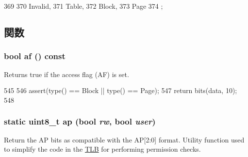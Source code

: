 \begin{DoxyCode}
369                        {
370             Invalid,
371             Table,
372             Block,
373             Page
374         };
\end{DoxyCode}


\subsection{関数}
\hypertarget{classArmISA_1_1TableWalker_1_1LongDescriptor_a8f028be885d2543df6e8a1278a54d30b}{
\subsubsection[{af}]{\setlength{\rightskip}{0pt plus 5cm}bool af () const}}
\label{classArmISA_1_1TableWalker_1_1LongDescriptor_a8f028be885d2543df6e8a1278a54d30b}
Returns true if the access flag (AF) is set. 


\begin{DoxyCode}
545         {
546             assert(type() == Block || type() == Page);
547             return bits(data, 10);
548         }
\end{DoxyCode}
\hypertarget{classArmISA_1_1TableWalker_1_1LongDescriptor_a86d1f2fd0beb21ce5ffa7925768e378b}{
\subsubsection[{ap}]{\setlength{\rightskip}{0pt plus 5cm}static uint8\_\-t ap (bool {\em rw}, \/  bool {\em user})}}
\label{classArmISA_1_1TableWalker_1_1LongDescriptor_a86d1f2fd0beb21ce5ffa7925768e378b}
Return the AP bits as compatible with the AP\mbox{[}2:0\mbox{]} format. Utility function used to simplify the code in the \hyperlink{classArmISA_1_1TLB}{TLB} for performing permission checks. 


